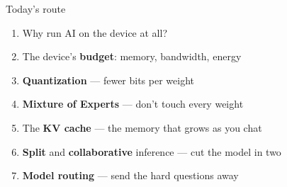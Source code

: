 \begin{frame}{Today's route}
  \vspace{0.5em}
  \raggedright
  \begin{enumerate}\itemsep5pt
    \item Why run AI on the device at all?
    \item The device's \textbf{budget}: memory, bandwidth, energy
    \item \textbf{Quantization} --- fewer bits per weight
    \item \textbf{Mixture of Experts} --- don't touch every weight
    \item The \textbf{KV cache} --- the memory that grows as you chat
    \item \textbf{Split} and \textbf{collaborative} inference --- cut the model in two
    \item \textbf{Model routing} --- send the hard questions away
  \end{enumerate}

  \vspace{0.7em}

  \vspace{0.5em}
\end{frame}

